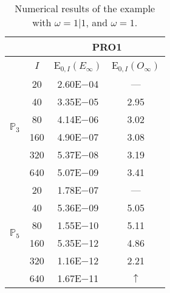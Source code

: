 \begin{table}[H]
\caption{Numerical results of the example with $\omega=1|1$, and $\omega=1$.}
\setlength{\tabcolsep}{5pt}
\centering
\begin{tabular}{@{}l c c c@{}}
\toprule
 &  & \multicolumn{2}{c}{PRO1}\\
\midrule
 & $I$ & E$_{0,I}(E_{\infty})$ & E$_{0,I}(O_{\infty})$\\
\midrule
\multirow{6}{*}{$\mathbb{P}_{3}$}
 & 20 & 2.60E$-$04 & ---\\
 & 40 & 3.35E$-$05 & 2.95\\
 & 80 & 4.14E$-$06 & 3.02\\
 & 160 & 4.90E$-$07 & 3.08\\
 & 320 & 5.37E$-$08 & 3.19\\
 & 640 & 5.07E$-$09 & 3.41\\
\midrule
\multirow{6}{*}{$\mathbb{P}_{5}$}
 & 20 & 1.78E$-$07 & ---\\
 & 40 & 5.36E$-$09 & 5.05\\
 & 80 & 1.55E$-$10 & 5.11\\
 & 160 & 5.35E$-$12 & 4.86\\
 & 320 & 1.16E$-$12 & 2.21\\
 & 640 & 1.67E$-$11 & $\uparrow$\\
\bottomrule
\end{tabular}
\label{Table:PRO:test_01_01_test43_pro1}
\end{table}
